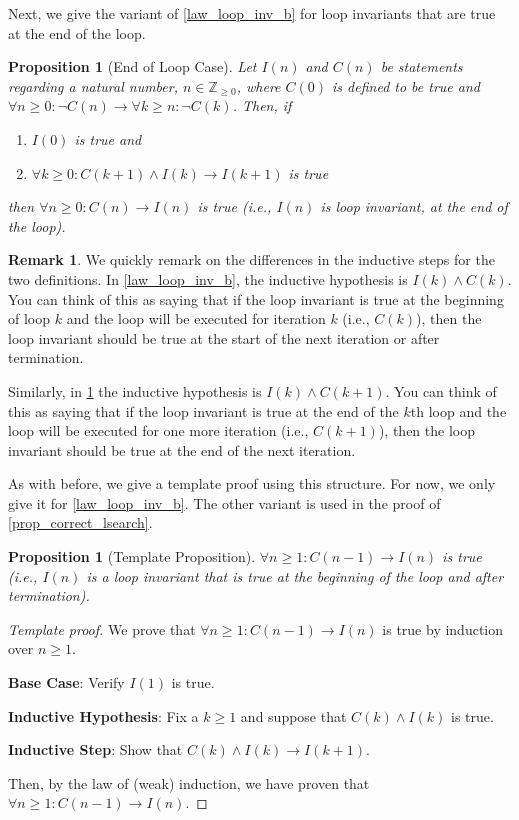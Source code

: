 \documentclass{article}
\newcommand{\ra}{\rightarrow}
\newcommand{\ZZ}{\mathbb{Z}_{\geq 0}}
\theoremstyle{plain}
\newtheorem{proposition}{Proposition}
\newtheorem*{proposition*}{Proposition}
\theoremstyle{definition}
\newtheorem{remark}{Remark}
\begin{document}
Next, we give the variant of \cref{law_loop_inv_b} for loop invariants that are true at the end of the loop.

\begin{proposition}[End of Loop Case]\label{law_loop_inv_e}
    Let \(I(n)\) and \(C(n)\) be statements regarding a natural number, \(n \in \ZZ\), where \(C(0)\) is defined to be true and \(\forall n \geq 0: \lnot C(n) \ra \forall k \geq n : \lnot C(k)\). Then, if
    \begin{enumerate}
        \item \(I(0)\) is true and
        \item \(\forall k \geq 0 : C(k+1) \land I(k) \ra I(k+1)\) is true
    \end{enumerate}    
    then \(\forall n \geq 0 : C(n) \ra I(n)\) is true (i.e., \(I(n)\) is loop invariant, at the end of the loop).
\end{proposition}

\begin{remark}
    We quickly remark on the differences in the inductive steps for the two definitions. In \cref{law_loop_inv_b}, the inductive hypothesis is \(I(k) \land C(k)\). You can think of this as saying that if the loop invariant is true at the beginning of loop \(k\) and the loop will be executed for iteration \(k\) (i.e., \(C(k)\)), then the loop invariant should be true at the start of the next iteration or after termination.

    Similarly, in \cref{law_loop_inv_e} the inductive hypothesis is \(I(k) \land C(k+1)\). You can think of this as saying that if the loop invariant is true at the end of the \(k\)th loop and the loop will be executed for one more iteration (i.e., \(C(k+1)\)), then the loop invariant should be true at the end of the next iteration.
\end{remark}

As with before, we give a template proof using this structure. For now, we only give it for \cref{law_loop_inv_b}. The other variant is used in the proof of \cref{prop_correct_lsearch}.

\begin{proposition*}[Template Proposition]
    \(\forall n \geq 1 : C(n-1) \ra I(n)\) is true (i.e., \(I(n)\) is a loop invariant that is true at the beginning of the loop and after termination).
\end{proposition*}
\begin{proof}[Template proof]
    We prove that \(\forall n \geq 1 : C(n-1) \ra I(n)\) is true by induction over \(n \geq 1\).
    
    \textbf{Base Case}: Verify \(I(1)\) is true.

    \textbf{Inductive Hypothesis}: Fix a \(k \geq 1\) and suppose that \(C(k) \land I(k)\) is true.

    \textbf{Inductive Step}: Show that \(C(k) \land I(k) \ra I(k+1)\).

    Then, by the law of (weak) induction, we have proven that \(\forall n \geq 1 : C(n-1) \ra I(n)\).
\end{proof}
\end{document}
